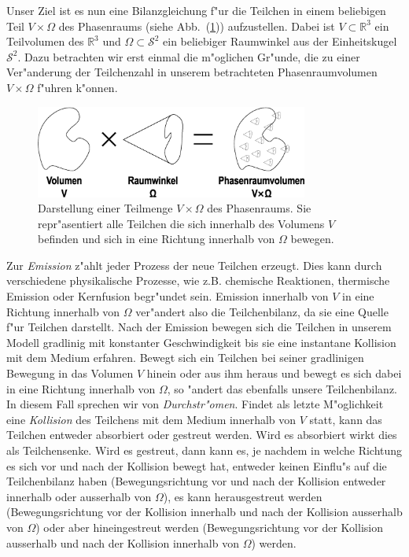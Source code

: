 \documentclass[11pt,a4paper,DIVcalc,BCOR8mm,titlepage,twoside]{scrartcl}
\begin{document}
	Unser Ziel ist es nun eine Bilanzgleichung f"ur die Teilchen in einem beliebigen Teil $V \times \Omega$ des Phasenraums (siehe Abb.~(\ref{fig:phasespacevolume})) aufzustellen. Dabei ist $V \subset \mathbb{R}^3$ ein Teilvolumen des $\mathbb{R}^3$ und $\Omega \subset \mathcal{S}^2$ ein beliebiger Raumwinkel aus der Einheitskugel $\mathcal{S}^2$. Dazu betrachten wir erst einmal die m"oglichen Gr"unde, die zu einer Ver"anderung der Teilchenzahl in unserem betrachteten Phasenraumvolumen $V \times \Omega$ f"uhren k"onnen.
	\begin{figure}
		\centering
		\includegraphics[width=0.8\textwidth]{phasespacevolume.eps}
		\caption{Darstellung einer Teilmenge $V \times \Omega$ des Phasenraums. Sie repr"asentiert alle Teilchen die sich innerhalb des Volumens $V$ befinden und sich in eine Richtung innerhalb von $\Omega$ bewegen.}
		\label{fig:phasespacevolume}
	\end{figure}

	Zur {\em Emission} z"ahlt jeder Prozess der neue Teilchen erzeugt. Dies kann durch verschiedene physikalische Prozesse, wie z.B. chemische Reaktionen, thermische Emission oder Kernfusion begr"undet sein. Emission innerhalb von $V$ in eine Richtung innerhalb von $\Omega$ ver"andert also die Teilchenbilanz, da sie eine Quelle f"ur Teilchen darstellt. Nach der Emission bewegen sich die Teilchen in unserem Modell gradlinig mit konstanter Geschwindigkeit bis sie eine instantane Kollision mit dem Medium erfahren. Bewegt sich ein Teilchen bei seiner gradlinigen Bewegung in das Volumen $V$ hinein oder aus ihm heraus und bewegt es sich dabei in eine Richtung innerhalb von $\Omega$, so "andert das ebenfalls unsere Teilchenbilanz. In diesem Fall sprechen wir von {\em Durchstr"omen}. Findet als letzte M"oglichkeit eine {\em Kollision} des Teilchens mit dem Medium innerhalb von $V$ statt, kann das Teilchen entweder absorbiert oder gestreut werden. Wird es absorbiert wirkt dies als Teilchensenke. Wird es gestreut, dann kann es, je nachdem in welche Richtung es sich vor und nach der Kollision bewegt hat, entweder keinen Einflu"s auf die Teilchenbilanz haben (Bewegungsrichtung vor und nach der Kollision entweder innerhalb oder ausserhalb von $\Omega$), es kann herausgestreut werden (Bewegungsrichtung vor der Kollision innerhalb und nach der Kollision ausserhalb von $\Omega$) oder aber hineingestreut werden (Bewegungsrichtung vor der Kollision ausserhalb und nach der Kollision innerhalb von $\Omega$) werden.
	
\end{document}
